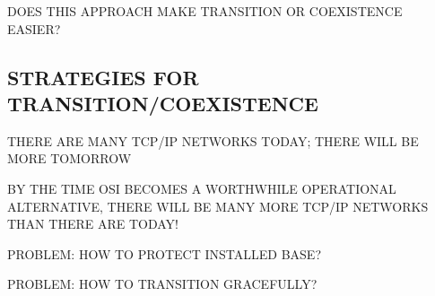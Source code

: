 \begin{bwslide}

\begin{nrtc}
\item	DOES THIS APPROACH MAKE TRANSITION OR COEXISTENCE EASIER?
\end{nrtc}
\end{bwslide}


\begin{bwslide}
\part	{STRATEGIES FOR TRANSITION/COEXISTENCE}\bf

\begin{nrtc}
\item	THERE ARE MANY TCP/IP NETWORKS TODAY; THERE WILL BE MORE TOMORROW

\item	BY THE TIME OSI BECOMES A WORTHWHILE OPERATIONAL ALTERNATIVE,
	THERE WILL BE MANY MORE TCP/IP NETWORKS THAN THERE ARE TODAY!

\item	PROBLEM: HOW TO PROTECT INSTALLED BASE?

\item	PROBLEM: HOW TO TRANSITION GRACEFULLY?
\end{nrtc}
\end{bwslide}


